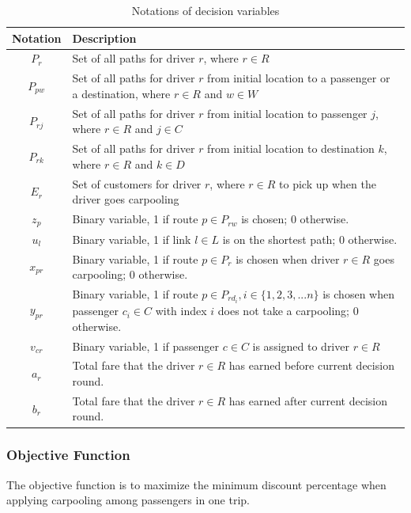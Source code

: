 \begin{table}[ht]
  \centering
  \caption{Notations of decision variables}
  \begin{tabularx}{\textwidth}{cX}
  \toprule
  Notation & Description \\
  \midrule
    $P_r$ & Set of all paths for driver $r$, where $r \in R$ \\
    $P_{pw}$ & Set of all paths for driver $r$ from initial location to a passenger or a destination, where $r \in R$ and $w \in W$ \\
    $P_{rj}$ & Set of all paths for driver $r$ from initial location to passenger $j$, where $r \in R$ and $j \in C$ \\
    $P_{rk}$ & Set of all paths for driver $r$ from initial location to destination $k$, where $r \in R$ and $k \in D$ \\
    $E_r$ & Set of customers for driver $r$, where $r \in R$ to pick up when the driver goes carpooling \\
    $z_p$ & Binary variable, 1 if route $p \in P_{rw}$ is chosen; 0 otherwise. \\
    $u_l$ & Binary variable, 1 if link $l \in L$ is on the shortest path; 0 otherwise. \\
    $x_{pr}$ & Binary variable, 1 if route $p \in P_r$ is chosen when driver $r \in R$ goes carpooling; 0 otherwise. \\
    $y_{pr}$ & Binary variable, 1 if route $p \in P_{rd_i}, i \in \{1,2,3,...n\}$ is chosen when passenger $c_i \in C$ with index $i$ does not take a carpooling; 0 otherwise. \\
    $v_{cr}$ & Binary variable, 1 if passenger $c \in C$ is assigned to driver $r \in R$ \\
    $a_r$ & Total fare that the driver $r \in R$ has earned before current decision round. \\
    $b_r$ & Total fare that the driver $r \in R$ has earned after current decision round. \\
  \bottomrule
  \end{tabularx}
\end{table}  
\newpage

\subsubsection*{Objective Function}

The objective function is to maximize the minimum discount percentage when applying carpooling among passengers in one trip.

